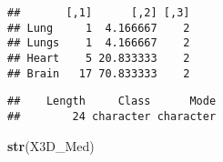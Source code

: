 \documentclass[]{article}
\newenvironment{Shaded}{\begin{snugshade}}{\end{snugshade}}
\newcommand{\DataTypeTok}[1]{\textcolor[rgb]{0.13,0.29,0.53}{#1}}
\newcommand{\KeywordTok}[1]{\textcolor[rgb]{0.13,0.29,0.53}{\textbf{#1}}}
\newcommand{\NormalTok}[1]{#1}
\newcommand{\OperatorTok}[1]{\textcolor[rgb]{0.81,0.36,0.00}{\textbf{#1}}}
\newcommand{\StringTok}[1]{\textcolor[rgb]{0.31,0.60,0.02}{#1}}
\begin{document}
\begin{verbatim}
##       [,1]      [,2] [,3]
## Lung     1  4.166667    2
## Lungs    1  4.166667    2
## Heart    5 20.833333    2
## Brain   17 70.833333    2
\end{verbatim}

\begin{Shaded}
\end{Shaded}

\begin{verbatim}
##    Length     Class      Mode 
##        24 character character
\end{verbatim}

\begin{Shaded}
\begin{Highlighting}[]
\KeywordTok{str}\NormalTok{(X3D_Med)}
\end{Highlighting}
\end{Shaded}
\end{document}
